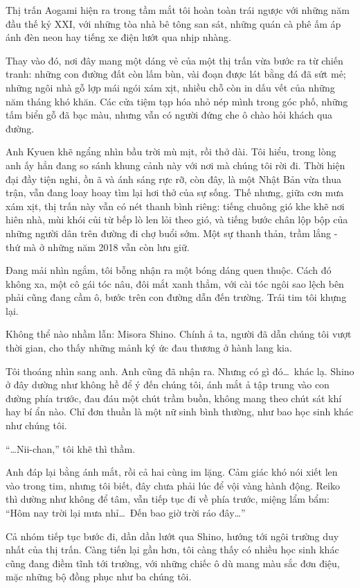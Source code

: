 \documentclass[../main.tex]{subfiles}
\begin{document}
Thị trấn Aogami hiện ra trong tầm mắt tôi hoàn toàn trái ngược với những năm đầu thế kỷ XXI, với những tòa nhà bê tông san sát, những quán cà phê ấm áp ánh đèn neon hay tiếng xe điện lướt qua nhịp nhàng.

Thay vào đó, nơi đây mang một dáng vẻ của một thị trấn vừa bước ra từ chiến tranh: những con đường đất còn lấm bùn, vài đoạn được lát bằng đá đã sứt mẻ; những ngôi nhà gỗ lợp mái ngói xám xịt, nhiều chỗ còn in dấu vết của những năm tháng khó khăn. Các cửa tiệm tạp hóa nhỏ nép mình trong góc phố, những tấm biển gỗ đã bạc màu, nhưng vẫn có người đứng che ô chào hỏi khách qua đường.

Anh Kyuen khẽ ngẩng nhìn bầu trời mù mịt, rồi thở dài. Tôi hiểu, trong lòng anh ấy hẳn đang so sánh khung cảnh này với nơi mà chúng tôi rời đi. Thời hiện đại đầy tiện nghi, ồn ã và ánh sáng rực rỡ, còn đây, là một Nhật Bản vừa thua trận, vẫn đang loay hoay tìm lại hơi thở của sự sống. Thế nhưng, giữa cơn mưa xám xịt, thị trấn này vẫn có nét thanh bình riêng: tiếng chuông gió khe khẽ nơi hiên nhà, mùi khói củi từ bếp lò len lỏi theo gió, và tiếng bước chân lộp bộp của những người dân trên đường đi chợ buổi sớm. Một sự thanh thản, trầm lắng - thứ mà ở những năm 2018 vẫn còn lưu giữ.

Đang mải nhìn ngắm, tôi bỗng nhận ra một bóng dáng quen thuộc. Cách đó không xa, một cô gái tóc nâu, đôi mắt xanh thẳm, với cài tóc ngôi sao lệch bên phải cũng đang cầm ô, bước trên con đường dẫn đến trường. Trái tim tôi khựng lại.

Không thể nào nhầm lẫn: Misora Shino. Chính ả ta, người đã dẫn chúng tôi vượt thời gian, cho thấy những mảnh ký ức đau thương ở hành lang kia.

Tôi thoáng nhìn sang anh. Anh cũng đã nhận ra. Nhưng có gì đó\dots\ khác lạ. Shino ở đây dường như không hề để ý đến chúng tôi, ánh mắt ả tập trung vào con đường phía trước, đau đáu một chút trầm buồn, không mang theo chút sát khí hay bí ẩn nào. Chỉ đơn thuần là một nữ sinh bình thường, như bao học sinh khác như chúng tôi.

``\dots Nii-chan,'' tôi khẽ thì thầm.

Anh đáp lại bằng ánh mắt, rồi cả hai cùng im lặng. Cảm giác khó nói xiết len vào trong tim, nhưng tôi biết, đây chưa phải lúc để vội vàng hành động. Reiko thì dường như không để tâm, vẫn tiếp tục đi về phía trước, miệng lẩm bẩm: ``Hôm nay trời lại mưa nhỉ\dots\ Đến bao giờ trời ráo đây\dots''

Cả nhóm tiếp tục bước đi, dần dần lướt qua Shino, hướng tới ngôi trường duy nhất của thị trấn. Càng tiến lại gần hơn, tôi càng thấy có nhiều học sinh khác cũng đang điềm tĩnh tới trường, với những chiếc ô dù mang màu sắc đơn điệu, mặc những bộ đồng phục như ba chúng tôi.
\end{document}
